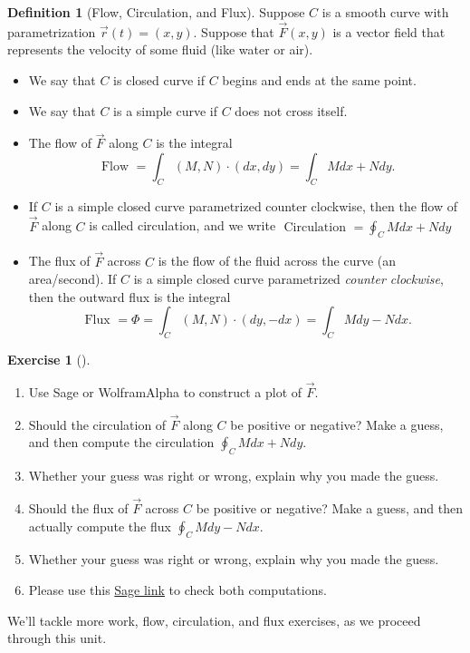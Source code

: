 \documentclass[10pt,]{book}
\theoremstyle{plain}
\theoremstyle{definition}
\newtheorem{definition}[theorem]{Definition}
\theoremstyle{definition}
\theoremstyle{definition}
\theoremstyle{definition}
\newtheorem{exploration}[project]{Exercise}
\theoremstyle{definition}
\numberwithin{equation}{section}
\newcommand{\sageworkfluxurl}{http://bmw.byuimath.com/dokuwiki/doku.php?id=both_flux_and_work}
\begin{document}
\begin{definition}[{Flow, Circulation, and Flux}]\label{definition-33}
Suppose \(C\) is a smooth curve with parametrization \(\vec r(t)=(x,y)\). Suppose that \(\vec F(x,y)\) is a vector field that represents the velocity of some fluid (like water or air). \leavevmode%
\begin{itemize}[label=\textbullet]
\item{}We say that \(C\) is closed curve if \(C\) begins and ends at the same point.%
\item{}We say that \(C\) is a simple curve if \(C\) does not cross itself.%
\item{}The flow of \(\vec F\) along \(C\) is the integral%
\begin{equation*}
\text{ Flow }  = \int_C (M,N)\cdot (dx,dy) = \int_C Mdx+Ndy.
\end{equation*}
%
\item{}If \(C\) is a simple closed curve parametrized counter clockwise, then the flow of \(\vec F\) along \(C\) is called circulation, and we write \(\text{ Circulation }  = \oint_C Mdx+Ndy\)%
\item{}The flux of \(\vec F\) across \(C\) is the flow of the fluid across the curve (an area/second). If \(C\) is a simple closed curve parametrized \emph{counter clockwise}, then the outward flux is the integral%
\begin{equation*}
\text{ Flux }  = \Phi = \int_C(M,N)\cdot (dy,-dx) =\int_C Mdy-Ndx .
\end{equation*}
%
\end{itemize}
%
\end{definition}
\begin{exploration}[]\label{exploration-196}
\leavevmode%
\begin{enumerate}[font=\bfseries,label=(\alph*),ref=\alph*]
\item\label{task-494} Use Sage or WolframAlpha to construct a plot of \(\vec F\).%
\item\label{task-495} Should the circulation of \(\vec F\) along \(C\) be positive or negative?  Make a guess, and then compute the circulation \(\oint_C Mdx+Ndy\).%
\item\label{task-496} Whether your guess was right or wrong, explain why you made the guess.%
\item\label{task-497} Should the flux of \(\vec F\) across \(C\) be positive or negative? Make a guess, and then actually compute the flux \(\oint_C Mdy-Ndx\).%
\item\label{task-498} Whether your guess was right or wrong, explain why you made the guess.%
\item\label{task-499} Please use this \href{\\sageworkfluxurl}{Sage link} to check both computations.%
\end{enumerate}
\end{exploration}
We'll tackle more work, flow, circulation, and flux exercises, as we proceed through this unit.%
\typeout{************************************************}
\typeout{************************************************}
\end{document}
